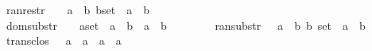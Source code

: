 \begin{isabellebody}
ran{\isacharunderscore}restr\ \ \ \ {\isacharcolon}{\isacharcolon}{\isachardoublequoteopen}{\isacharbrackleft}{\isacharprime}a\ {\isacharless}{\isacharequal}{\isachargreater}\ {\isacharprime}b{\isacharcomma}\ {\isacharparenleft}{\isacharprime}b{\isacharparenright}set{\isacharbrackright}\ {\isacharequal}{\isachargreater}\ {\isacharprime}a\ {\isacharless}{\isacharequal}{\isachargreater}\ {\isacharprime}b{\isachardoublequoteclose}\ \ \ \ \ \ {\isacharparenleft}{\isachardoublequoteopen}{\isacharunderscore}\ {\isacharcolon}{\isachargreater}\ {\isacharunderscore}{\isachardoublequoteclose}\ \ {\isacharbrackleft}{}{}{\isacharcomma}{}{}{\isacharbrackright}\ {}{}{\isacharparenright}\isanewline
dom{\isacharunderscore}substr\ \ \ {\isacharcolon}{\isacharcolon}{\isachardoublequoteopen}{\isacharbrackleft}\ {\isacharparenleft}{\isacharprime}a{\isacharparenright}set\ {\isacharcomma}\ {\isacharprime}a\ {\isacharless}{\isacharequal}{\isachargreater}\ {\isacharprime}b{\isacharbrackright}\ {\isacharequal}{\isachargreater}\ {\isacharprime}a\ {\isacharless}{\isacharequal}{\isachargreater}\ {\isacharprime}b{\isachardoublequoteclose}\ \ \ \ {\isacharparenleft}{\isachardoublequoteopen}{\isacharunderscore}\ {\isacharless}{\isacharminus}{\isacharcolon}\ {\isacharunderscore}{\isachardoublequoteclose}\ {\isacharbrackleft}{}{}{\isacharcomma}{}{}{\isacharbrackright}\ {}{}{\isacharparenright}\isanewline
ran{\isacharunderscore}substr\ \ \ {\isacharcolon}{\isacharcolon}{\isachardoublequoteopen}{\isacharbrackleft}{\isacharprime}a\ {\isacharless}{\isacharequal}{\isachargreater}\ {\isacharprime}b{\isacharcomma}\ {\isacharparenleft}{\isacharprime}b{\isacharparenright}\ set{\isacharbrackright}\ {\isacharequal}{\isachargreater}\ {\isacharparenleft}{\isacharprime}a\ {\isacharless}{\isacharequal}{\isachargreater}\ {\isacharprime}b{\isacharparenright}{\isachardoublequoteclose}\ \ \ {\isacharparenleft}{\isachardoublequoteopen}{\isacharunderscore}\ {\isacharcolon}{\isacharminus}{\isachargreater}\ {\isacharunderscore}{\isachardoublequoteclose}\ {\isacharbrackleft}{}{}{\isacharcomma}{}{}{\isacharbrackright}\ {}{}{\isacharparenright}\isanewline
\isanewline
trans{\isacharunderscore}clos\ \ \ {\isacharcolon}{\isacharcolon}{\isachardoublequoteopen}{\isacharparenleft}{\isacharprime}a\ {\isacharless}{\isacharequal}{\isachargreater}\ {\isacharprime}a{\isacharparenright}\ {\isacharequal}{\isachargreater}\ {\isacharparenleft}{\isacharprime}a\ {\isacharless}{\isacharequal}{\isachargreater}\ {\isacharprime}a{\isacharparenright}\ {\isachardoublequoteclose}\ \ \ \ \ \ \ \ \ \ \ \ {\isacharparenleft}{\isachardoublequoteopen}{\isacharunderscore}\ {\isacharpercent}{\isacharplus}{\isachardoublequoteclose}\ \ \ \ \ {\isacharbrackleft}{}{}{}{}{\isacharbrackright}\ {}{}{}{\isacharparenright}\isanewline

\end{isabellebody}
